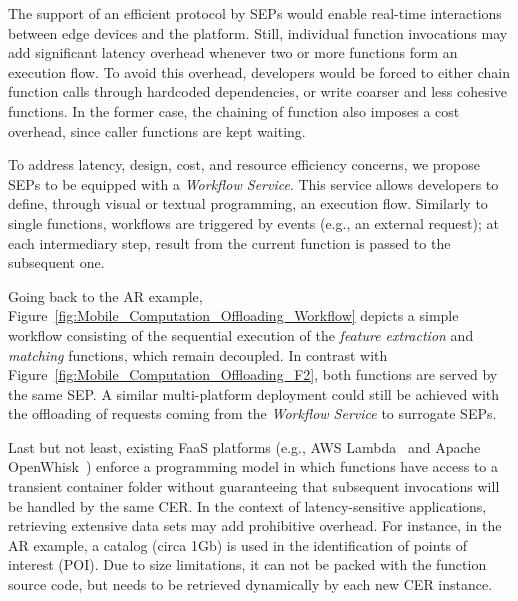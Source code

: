 
The support of an efficient protocol by SEPs would enable real-time interactions between edge devices and the platform. Still, individual function invocations may add significant latency overhead whenever two or more functions form an execution flow. To avoid this overhead, developers would be forced to either chain function calls through hardcoded dependencies, or write coarser and less cohesive functions. In the former case, the chaining of function also imposes a cost overhead, since caller functions are kept waiting.%

To address latency, design, cost, and resource efficiency concerns, we propose SEPs to be equipped with a \textit{Workflow Service}. This service allows developers to define, through visual or textual programming, an execution flow.
Similarly to single functions, workflows are triggered by events (e.g., an external request); at each intermediary step, result from the current function is passed to the subsequent one. 

Going back to the AR example, Figure~\ref{fig:Mobile_Computation_Offloading_Workflow} depicts a simple workflow consisting of the sequential execution of the \textit{feature extraction} and \textit{matching} functions, which remain decoupled. In contrast with Figure~\ref{fig:Mobile_Computation_Offloading_F2}, both functions are served by the same SEP. A similar multi-platform deployment could still be achieved with the offloading of requests coming from the \textit{Workflow Service} to surrogate SEPs.

Last but not least, existing FaaS platforms (e.g., AWS Lambda~\cite{AWSLambda} and Apache OpenWhisk~\cite{OpenWhisk}) enforce a programming model in which functions have access to a transient container folder without guaranteeing that subsequent invocations will be handled by the same CER. %
In the context of latency-sensitive applications, retrieving extensive data sets may add prohibitive overhead. For instance, in the AR example, a catalog (circa 1Gb) is used in the identification of points of interest (POI).
Due to size limitations, it can not be packed with the function source code, but needs to be retrieved dynamically by each new CER instance.

